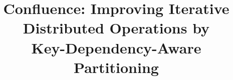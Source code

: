 \documentclass[10pt,journal,compsoc]{IEEEtran}
\begin{document}
%
\title{Confluence: Improving Iterative \\Distributed Operations by\\ Key-Dependency-Aware Partitioning}
%
%
%
%

\end{document}
